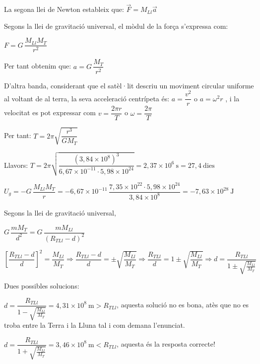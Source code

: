 \begin{solapartat}
La segona llei de Newton estableix que: $\vec{F} = M_{Ll}\vec{a}$ \quad {}

Segons la llei de gravitació universal, el mòdul de la força s'expressa com:

$F = G\,\dfrac{M_{Ll}M_T}{r^2}$ \quad {}

Per tant obtenim que: $a = G\,\dfrac{M_T}{r^2}$ \quad {}

D'altra banda, considerant que el satèl·lit descriu un moviment circular uniforme al voltant de al terra, la seva acceleració centrípeta és: $a = \dfrac{v^2}{r}$ o $a = \omega^2 r$ , i la velocitat es pot expressar com $v = \dfrac{2\pi r}{T}$ o $\omega = \dfrac{2\pi}{T}$ \quad {}

Per tant: $T = 2\pi\sqrt{\dfrac{r^3}{GM_T}}$ \quad {}

Llavors: $T = 2\pi\sqrt{\dfrac{(3,84\times 10^{8})^3}{6,67\times 10^{-11}\cdot 5,98\times 10^{24}}} = 2,37\times 10^{6}\ \mathrm{s} = 27,4\ \text{dies}$ \quad {}

 $U_g = -G\,\dfrac{M_{Ll}M_T}{r} = -6,67\times 10^{-11}\,\dfrac{7,35\times 10^{22}\cdot 5,98\times 10^{24}}{3,84\times 10^{8}} = -7,63\times 10^{28}\ \mathrm{J}$ \quad {}
\end{solapartat}

\begin{solapartat}
Segons la llei de gravitació universal,

 $G\,\dfrac{mM_T}{d^2} = G\,\dfrac{mM_{Ll}}{(R_{TLl}-d)^2}$

 $\left[\dfrac{R_{TLl}-d}{d}\right]^2 = \dfrac{M_{Ll}}{M_T} \Longrightarrow \dfrac{R_{TLl}-d}{d} = \pm\sqrt{\dfrac{M_{Ll}}{M_T}} \Longrightarrow \dfrac{R_{TLl}}{d} = 1 \pm \sqrt{\dfrac{M_{Ll}}{M_T}} \Longrightarrow d = \dfrac{R_{TLl}}{1 \pm \sqrt{\frac{M_{Ll}}{M_T}}}$

Dues possibles solucions:

 $d = \dfrac{R_{TLl}}{1-\sqrt{\frac{M_{Ll}}{M_T}}} = 4,31\times 10^{8}\ \mathrm{m} > R_{TLl}$, aquesta solució no es bona, atès que no es troba entre la Terra i la Lluna tal i com demana l'enunciat.

$d = \dfrac{R_{TLl}}{1+\sqrt{\frac{M_{Ll}}{M_T}}} = 3,46\times 10^{8}\ \mathrm{m} < R_{TLl}$, aquesta és la resposta correcte!
\end{solapartat}
